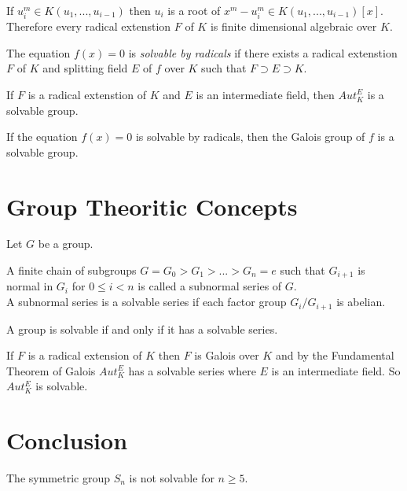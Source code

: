 \begin{remark}
If \(u_i^m \in K(u_1,...,u_{i-1})\) then \(u_i\) is a root of \(x^m-u_i^m \in K(u_1,...,u_{i-1})[x]\). \\
Therefore every radical extenstion \(F\) of \(K\) is finite dimensional algebraic over \(K\).
\end{remark}

\begin{definition}
The equation \(f(x)=0\) is \textit{solvable by radicals} if there exists a radical extenstion \(F\) of \(K\) and splitting field \(E\) of \(f\) over \(K\) such that \(F \supset E \supset K\).
\end{definition}

\begin{theorem}
If \(F\) is a radical extenstion of \(K\) and \(E\) is an intermediate field, then \(Aut_K^E\) is a solvable group.
\end{theorem}

\begin{corollary}
If the equation \(f(x)=0\) is solvable by radicals, then the Galois group of \(f\) is a solvable group.
\end{corollary}

\section{Group Theoritic Concepts}
Let \(G\) be a group. 

\begin{definition}
A finite chain of subgroups \(G=G_0>G_1>...>G_n={e}\) such that \(G_{i+1}\) is normal in \(G_i\) for \(0 \leq i < n\) is called a subnormal series of \(G\).\\
A subnormal series is a solvable series if each factor group \(G_i/G_{i+1}\) is abelian.
\end{definition}

\begin{definition}
A group is solvable if and only if it has a solvable series.
\end{definition}

If \(F\) is a radical extension of \(K\) then \(F\) is Galois over \(K\) and by the Fundamental Theorem of Galois \(Aut_K^E\) has a solvable series where \(E\) is an intermediate field. So \(Aut_K^E\) is solvable.

\section{Conclusion}
\begin{theorem}
The symmetric group \(S_n\) is not solvable for \(n \geq 5\).
\end{theorem}

